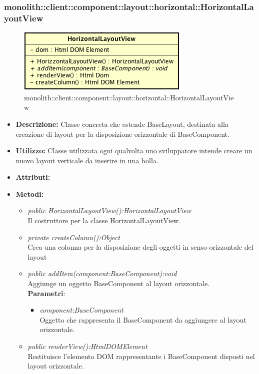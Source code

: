 \subsubsection{monolith::client::component::layout::horizontal::HorizontalLayoutView}

\label{monolith::client::component::layout::horizontal::HorizontalLayoutView}
\begin{figure}[H]
	\centering
	\includegraphics[scale=0.5]{Sezioni/SottosezioniST/img/HorizontalLayoutView.png}
	\caption{monolith::client::component::layout::horizontal::HorizontalLayoutView}
\end{figure}

\begin{itemize}
\item \textbf{Descrizione:} Classe concreta che estende BaseLayout, destinata alla creazione di layout  per la disposizione orizzontale di BaseComponent.
\item \textbf{Utilizzo:} Classe utilizzata ogni qualvolta uno sviluppatore intende creare un nuovo layout verticale da inserire in una bolla.
\item \textbf{Attributi:}
\item \textbf{Metodi:}
\begin{itemize}
\item\textit{public HorizontalLayoutView():HorizontalLayoutView}\\
Il costruttore per la classe HorizontalLayoutView.
\item \textit{private createColumn():Object}\\
Crea una colonna per la disposizione degli oggetti in senso orizzontale del layout
\item \textit{public addItem(component:BaseComponent):void}\\
Aggiunge un oggetto BaseComponent al layout orizzontale.
\\ \textbf{Parametri}: \begin{itemize}
\item \textit{component:BaseComponent}\\
Oggetto che rappresenta il BaseComponent da aggiungere al layout orizzontale.
\end{itemize}
\item \textit{public renderView():HtmlDOMElement}\\
Restituisce l'elemento DOM rappresentante i BaseComponent disposti nel layout orizzontale.
\end{itemize}
\end{itemize}
